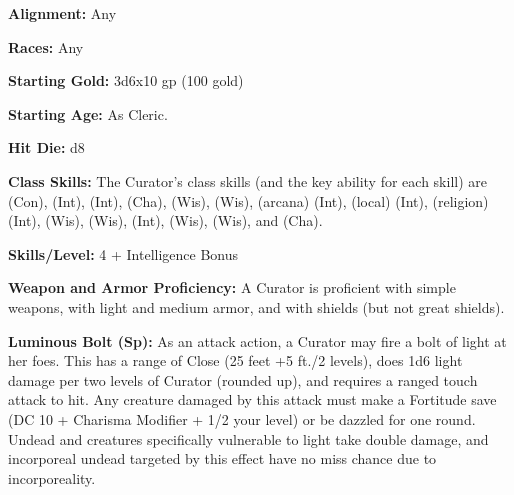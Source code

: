 
\textbf{Alignment:} Any

\textbf{Races:} Any

\textbf{Starting Gold:} 3d6x10 gp (100 gold)

\textbf{Starting Age:} As Cleric.

\textbf{Hit Die:} d8

\textbf{Class Skills:} The Curator's class skills (and the key ability for each skill) are  (Con),  (Int),  (Int),  (Cha),  (Wis),  (Wis),  (arcana) (Int),  (local) (Int),  (religion) (Int),  (Wis),  (Wis),  (Int),  (Wis),  (Wis), and  (Cha).

\textbf{Skills/Level:} 4 + Intelligence Bonus

\modebab{}
\goodfor{}
\poorref{}
\goodwil{}

\begin{classtable}
\end{classtable}

\classfeatures

\textbf{Weapon and Armor Proficiency:} A Curator is proficient with simple weapons, with light and medium armor, and with shields (but not great shields).

\textbf{Luminous Bolt (Sp):} As an attack action, a Curator may fire a bolt of light at her foes. This has a range of Close (25 feet +5 ft./2 levels), does 1d6 light damage per two levels of Curator (rounded up), and requires a ranged touch attack to hit. Any creature damaged by this attack must make a Fortitude save (DC 10 + Charisma Modifier + 1/2 your level) or be dazzled for one round. Undead and creatures specifically vulnerable to light take double damage, and incorporeal undead targeted by this effect have no miss chance due to incorporeality.

